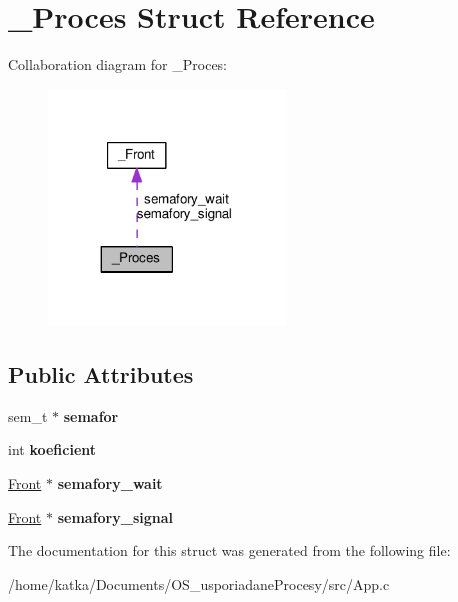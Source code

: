 \hypertarget{struct__Proces}{}\section{\+\_\+\+Proces Struct Reference}
\label{struct__Proces}


Collaboration diagram for \+\_\+\+Proces\+:
\nopagebreak
\begin{figure}[H]
\begin{center}
\leavevmode
\includegraphics[width=179pt]{struct__Proces__coll__graph}
\end{center}
\end{figure}
\subsection*{Public Attributes}
\begin{DoxyCompactItemize}
\item 
sem\+\_\+t $\ast$ {\bfseries semafor}\hypertarget{struct__Proces_ae861d8129ec67d9e340f035f371d0d1d}{}\label{struct__Proces_ae861d8129ec67d9e340f035f371d0d1d}

\item 
int {\bfseries koeficient}\hypertarget{struct__Proces_adc9eff4877d9e51470d0a9c386b00c40}{}\label{struct__Proces_adc9eff4877d9e51470d0a9c386b00c40}

\item 
\hyperlink{struct__Front}{Front} $\ast$ {\bfseries semafory\+\_\+wait}\hypertarget{struct__Proces_a084d71b0a72065a85df0f51e9b1b3107}{}\label{struct__Proces_a084d71b0a72065a85df0f51e9b1b3107}

\item 
\hyperlink{struct__Front}{Front} $\ast$ {\bfseries semafory\+\_\+signal}\hypertarget{struct__Proces_acb70bd09f8b74c247a3040236a35c2f3}{}\label{struct__Proces_acb70bd09f8b74c247a3040236a35c2f3}

\end{DoxyCompactItemize}


The documentation for this struct was generated from the following file\+:\begin{DoxyCompactItemize}
\item 
/home/katka/\+Documents/\+O\+S\+\_\+usporiadane\+Procesy/src/App.\+c\end{DoxyCompactItemize}
